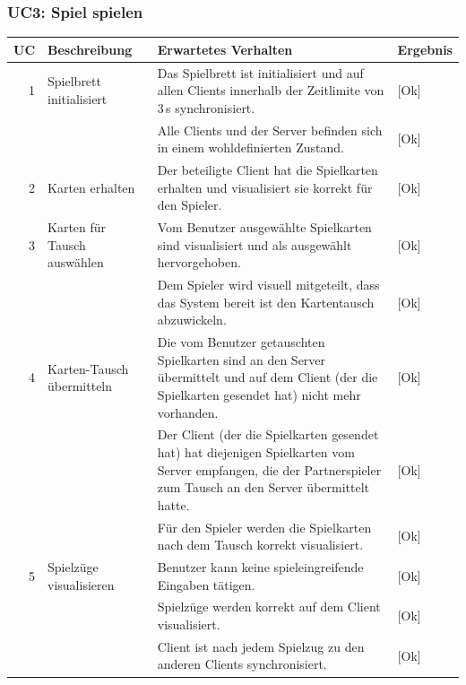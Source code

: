 \documentclass[12pt,halfparskip]{scrartcl}
\begin{document}
\subsubsection{UC3: Spiel spielen}
	\begin {tabular}{r | p{3cm} | p{9cm} | l}
		\toprule
		\textbf{UC} & \textbf{Beschreibung} & \textbf{Erwartetes Verhalten} & \textbf{Ergebnis} \\
		\midrule
		1 & Spielbrett initialisiert & Das Spielbrett ist initialisiert und auf allen Clients innerhalb der Zeitlimite von 3\,s synchronisiert. & [Ok] \\
		 \cline{3-4} & & Alle Clients und der Server befinden sich in einem wohldefinierten Zustand. & [Ok] \\
		\midrule
		2 & Karten erhalten & Der beteiligte Client hat die Spielkarten erhalten und visualisiert sie korrekt für den Spieler. & [Ok] \\
		\midrule
		3 & Karten für Tausch auswählen & Vom Benutzer ausgewählte Spielkarten sind visualisiert und als ausgewählt hervorgehoben. & [Ok] \\
		 \cline{3-4} & & Dem Spieler wird visuell mitgeteilt, dass das System bereit ist den Kartentausch abzuwickeln. & [Ok] \\
		\midrule
		4 & Karten-Tausch übermitteln & Die vom Benutzer getauschten Spielkarten sind an den Server übermittelt und auf dem Client (der die Spielkarten gesendet hat) nicht mehr vorhanden. & [Ok] \\
		 \cline{3-4} & & Der Client (der die Spielkarten gesendet hat) hat diejenigen Spielkarten vom Server empfangen, die der Partnerspieler zum Tausch an den Server übermittelt hatte. & [Ok] \\
		 \cline{3-4} & & Für den Spieler werden die Spielkarten nach dem Tausch korrekt visualisiert. & [Ok] \\
		\midrule
		5 & Spielzüge visualisieren & Benutzer kann keine spieleingreifende Eingaben tätigen. & [Ok] \\
		 \cline{3-4} & & Spielzüge werden korrekt auf dem Client visualisiert. & [Ok] \\
		 \cline{3-4} & & Client ist nach jedem Spielzug zu den anderen Clients synchronisiert. & [Ok] \\
		\midrule
	\end{tabular}
		
\end{document}
